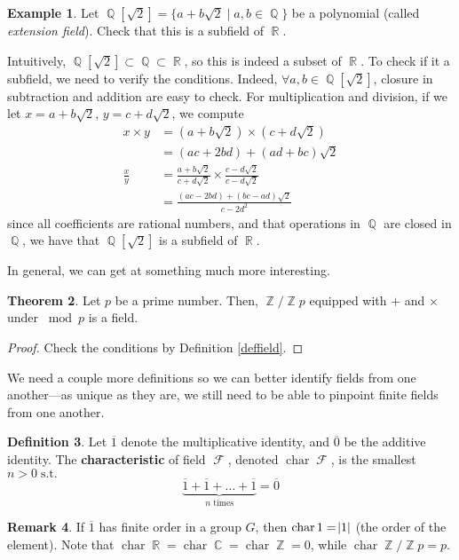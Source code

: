 \documentclass[11pt]{amsart} %
\theoremstyle{definition}
\newtheorem{definition}{Definition}[section]
\newtheorem{theorem}[definition]{Theorem}
\newtheorem{example}[definition]{Example}
\theoremstyle{definition}
\newtheorem{remark}[definition]{Remark}
\DeclareMathOperator{\Q}{\mathbb{Q}}
\DeclareMathOperator{\R}{\mathbb{R}}
\DeclareMathOperator{\Z}{\mathbb{Z}}
\DeclareMathOperator{\FF}{\mathcal{F}}
\DeclareMathOperator{\charr}{char}
\DeclareMathOperator{\Com}{\mathbb{C}}
\DeclareMathOperator{\suchthat}{\text{ s.t. }}
\numberwithin{equation}{section}
\begin{document}
\begin{example}
	Let $\Q[ \sqrt{2} ] = \{ a + b\sqrt{2} \mid  a,b \in \Q \}$ be a polynomial (called \textit{extension field}). Check that this is a subfield of $\R$.
	
	Intuitively, $\Q [\sqrt{2}] \subset \Q \subset \R$, so this is indeed a subset of $\R$. To check if it a subfield, we need to verify the conditions. Indeed, $\forall a,b \in \Q[ \sqrt{2} ] $, closure in subtraction and addition are easy to check. For multiplication and division, if we let $x= a+b\sqrt{2}$, $y=c+d\sqrt{2}$, we compute
	$$\begin{aligned}
		x \times y&= (a+b\sqrt{2}) \times (c+d\sqrt{2}) \\
		&= (ac + 2bd) + (ad + bc) \sqrt{2} \\
		\frac{x}{y} &= \frac{a+b\sqrt{2}}{c+d\sqrt{2}} \times \frac{c-d\sqrt{2}}{c-d\sqrt{2}} \\
		&= \frac{(ac - 2bd) + ( bc- ad ) \sqrt{2} }{c- 2 d^2}
	\end{aligned}$$
	since all coefficients are rational numbers, and that operations in $\Q$ are closed in $\Q$, we have that $\Q[\sqrt{2}]$ is a subfield of $\R$.
\end{example}

In general, we can get at something much more interesting.

\begin{theorem}
	Let $p$ be a prime number. Then, $\Z / \Z p $ equipped with $+$ and $\times$ under $\bmod p$ is a field.
\end{theorem}

\begin{proof}
	Check the conditions by Definition \ref{deffield}.
\end{proof}

We need a couple more definitions so we can better identify fields from one another---as unique as they are, we still need to be able to pinpoint finite fields from one another.

\begin{definition}
	Let $\overline{1}$ denote the multiplicative identity, and $\overline{0}$ be the additive identity. The \textbf{characteristic} of field $\FF$, denoted $\charr \FF$, is the smallest $n>0 \suchthat$
	$$ \underbrace{ \overline{1} + \overline{1} + \dots + \overline{1} }_{n \text{ times}} = \overline{ 0}$$
\end{definition}

\begin{remark}
	If $\overline{ 1} $ has finite order in a group $G$, then $\charr 1 = \abs{1}$ (the order of the element). Note that $\charr \R = \charr \Com = \charr \Z = 0$, while $\charr \Z / \Z p = p$.
\end{remark}
\end{document}
